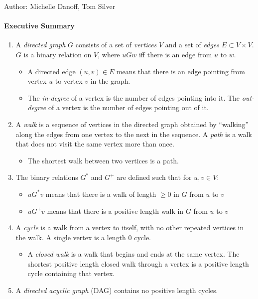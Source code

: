 \documentclass[solution, letterpaper]{cs20inclass}
\begin{document}

\noindent Author: Michelle Danoff, Tom Silver%

\paragraph*{Executive Summary}
\begin{enumerate}
\item A \textit{directed graph} $G$ consists of a set of \textit{vertices} $V$ and a set of \textit{edges} $E \subset V \times V$. $G$ is a binary relation on $V$, where $uGw$ iff there is an edge from $u$ to $w$.
\begin{itemize}
\item A directed edge $(u,v) \in E$ means that there is an edge pointing from vertex $u$ to vertex $v$ in the graph.
\item The \textit{in-degree} of a vertex is the number of edges pointing into it. The \textit{out-degree} of a vertex is the number of edges pointing out of it.
\end{itemize}
\item A \textit{walk} is a sequence of vertices in the directed graph obtained by ``walking'' along the edges from one vertex to the next in the sequence. A \textit{path} is a walk that does not visit the same vertex more than once.
\begin{itemize}
\item The shortest walk between two vertices is a path. 
\end{itemize}
\item The binary relations $G^*$ and $G^+$ are defined such that for $u, v \in V$:
\begin{itemize}
\item $u G^* v$ means that there is a walk of length $\ge 0$ in $G$ from $u$ to $v$
\item $u G^+ v$ means that there is a positive length walk in $G$ from $u$ to $v$
\end{itemize}
\item A \textit{cycle} is a walk from a vertex to itself, with no other repeated vertices in the walk. A single vertex is a length 0 cycle.
\begin{itemize}
\item A \textit{closed walk} is a walk that begins and ends at the same vertex. The shortest positive length closed walk through a vertex is a positive length cycle containing that vertex.
\end{itemize}
\item A \textit{directed acyclic graph} (DAG) contains no positive length cycles.

\end{enumerate}
\end{document}
